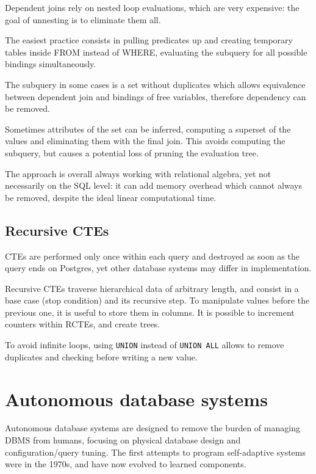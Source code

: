Dependent joins rely on nested loop evaluations, which are very expensive: the goal of unnesting is to eliminate them all.

The easiest practice consists in pulling predicates up and creating temporary tables inside FROM instead of WHERE, evaluating the subquery for all possible bindings simultaneously. 

The subquery in some cases is a set without duplicates which allows equivalence between dependent join and bindings of free variables, therefore dependency can be removed.

Sometimes attributes of the set can be inferred, computing a superset of the values and eliminating them with the final join. This avoids computing the subquery, but causes a potential loss of pruning the evaluation tree.

The approach is overall always working with relational algebra, yet not necessarily on the SQL level: it can add memory overhead which cannot always be removed, despite the ideal linear computational time.

\subsection{Recursive CTEs}
CTEs are performed only once within each query and destroyed as soon as the query ends on Postgres, yet other database systems may differ in implementation. 

Recursive CTEs traverse hierarchical data of arbitrary length, and consist in a base case (stop condition) and its recursive step. To manipulate values before the previous one, it is useful to store them in columns. It is possible to increment counters within RCTEs, and create trees. 

To avoid infinite loops, using \texttt{UNION} instead of \texttt{UNION ALL} allows to remove duplicates and checking before writing a new value.






\section{Autonomous database systems}
Autonomous database systems are designed to remove the burden of managing DBMS from humans, focusing on physical database design and configuration/query tuning. The first attempts to program self-adaptive systems were in the 1970s, and have now evolved to learned components. 

